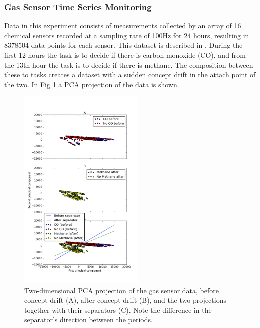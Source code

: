 \documentclass[11pt,twocolumn,varwidth=true,a4paper,fleqn]{article}
\begin{document}

\subsubsection{Gas Sensor Time Series Monitoring} 
Data in this experiment consists of measurements collected
by an array of 16 chemical sensors recorded at a sampling
rate of 100Hz for 24 hours, resulting in 8378504 data points for each sensor. 
This dataset is described in \cite{bigGas}.
During the first 12 hours the task is to decide if there is carbon monoxide
(CO), and from the 13th hour the task is to decide if there is methane. 
The composition between these to tasks creates a dataset with a sudden concept
drift in the attach point of the two.  
In Fig \ref{BigGasShowData} a PCA projection of the data is shown.

\begin{figure}[h]
\centering
\includegraphics[width=60mm]{BigGas/showData.png}
\caption{Two-dimensional PCA projection of the gas sensor data, 
before concept drift (A), after concept drift (B), 
and the two projections together with their separators (C). 
Note the difference in the separator's
direction between the periods.}
\label{BigGasShowData}
\end{figure}
\end{document}

